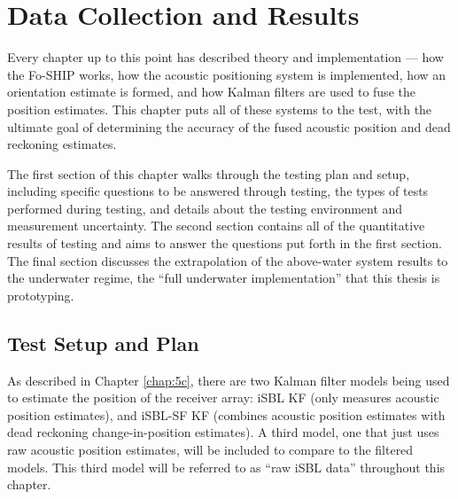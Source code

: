 \documentclass[11pt]{ucthesisCP}
\begin{document}





\chapter{Data Collection and Results} \label{chap:6c}
Every chapter up to this point has described theory and implementation --- how the Fo-SHIP works, how the acoustic positioning system is implemented, how an orientation estimate is formed, and how Kalman filters are used to fuse the position estimates. This chapter puts all of these systems to the test, with the ultimate goal of determining the accuracy of the fused acoustic position and dead reckoning estimates.

The first section of this chapter walks through the testing plan and setup, including specific questions to be answered through testing, the types of tests performed during testing, and details about the testing environment and measurement uncertainty. The second section contains all of the quantitative results of testing and aims to answer the questions put forth in the first section. The final section discusses the extrapolation of the above-water system results to the underwater regime, the “full underwater implementation” that this thesis is prototyping.

\section{Test Setup and Plan} \label{sec:6s1}
As described in Chapter \ref{chap:5c}, there are two Kalman filter models being used to estimate the position of the receiver array: iSBL KF (only measures acoustic position estimates), and iSBL-SF KF (combines acoustic position estimates with dead reckoning change-in-position estimates). A third model, one that just uses raw acoustic position estimates, will be included to compare to the filtered models. This third model will be referred to as “raw iSBL data” throughout this chapter.
\end{document}
